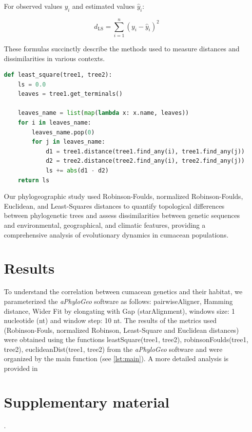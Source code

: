 For observed values $y_i$ and estimated values $\hat{y}_i$:

\begin{equation}\label{eq:ls}
    d_{\text{LS}} = \sum_{i=1}^{n} (y_i - \hat{y}_i)^2
\end{equation}

These formulas succinctly describe the methods used to measure distances and dissimilarities in various contexts.

\begin{lstlisting}[label=lst:LeastSquare, language=Python, caption=Python script for calculating the Least-Square distance using the ete3 package in the aPhyloGeo package]
def least_square(tree1, tree2):
    ls = 0.0
    leaves = tree1.get_terminals()

    leaves_name = list(map(lambda x: x.name, leaves))
    for i in leaves_name:
        leaves_name.pop(0)
        for j in leaves_name:
            d1 = tree1.distance(tree1.find_any(i), tree1.find_any(j))
            d2 = tree2.distance(tree2.find_any(i), tree2.find_any(j))
            ls += abs(d1 - d2)
    return ls
\end{lstlisting}

Our phylogeographic study used Robinson-Foulds, normalized Robinson-Foulds, Euclidean, and Least-Squares distances to quantify topological differences between phylogenetic trees and assess dissimilarities between genetic sequences and environmental, geographical, and climatic features, providing a comprehensive analysis of evolutionary dynamics in cumacean populations.

\section{Results}\label{results}

To understand the correlation between cumacean genetics and their habitat, we parameterized the \textit{aPhyloGeo} software as follows: pairwiseAligner, Hamming distance, Wider Fit by elongating with Gap (starAlignment), windows size: 1 nucleotide (nt) and window step: 10 nt. The results of the metrics used (Robinson-Fouls, normalized Robinson, Least-Square and Euclidean distances) were obtained using the functions leastSquare(tree1, tree2), robinsonFoulds(tree1, tree2), euclideanDist(tree1, tree2) from the \textit{aPhyloGeo} software and were organized by the main function (see \autoref{lst:main}). A more detailed analysis is provided in \section*{Supplementary material}.

